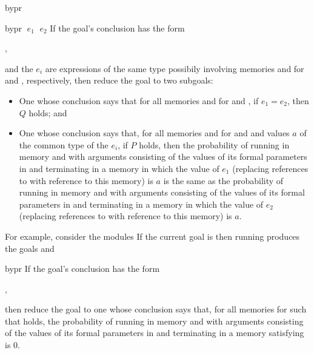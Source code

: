 \begin{tactic}{bypr}
  \begin{tsyntax}{bypr $\;e_1$ $\;e_2$}
    If the goal's conclusion has the form
    \begin{center}
      ,
    \end{center}
    and the $e_i$ are expressions of the same type possibily
    involving memories  and  for  and
    , respectively, then reduce the goal to two subgoals:
    \begin{itemize}
    \item One whose conclusion says that for all memories 
      and  for  and , if $e_1 = e_2$,
      then $Q$ holds; and

    \item One whose conclusion says that, for all memories  and
       for  and  and values $a$ of the
      common type of the $e_i$, if $P$ holds, then the probability of
      running  in memory  and with arguments
      consisting of the values of its formal parameters in  and
      terminating in a memory in which the value of $e_1$ (replacing
      references to  with reference to this memory) is $a$ is
      the same as the probability of running  in memory
       and with arguments consisting of the values of its
      formal parameters in  and terminating in a memory in
      which the value of $e_2$ (replacing references to  with
      reference to this memory) is $a$.
    \end{itemize}

    \medskip For example, consider the modules
    If the current goal is
     then
    running 
    produces the goals
    and
  \end{tsyntax}

  \begin{tsyntax}{bypr}
    If the goal's conclusion has the form
    \begin{center}
      ,
    \end{center}
    then reduce the goal to one whose conclusion says that, for all
    memories  for  such that  holds,
    the probability of running  in memory  and
    with arguments consisting of the values of its formal parameters
    in  and terminating in a memory satisfying  is $0$.


\end{tsyntax}
\end{tactic}
